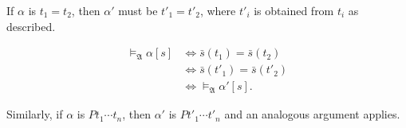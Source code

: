 If $\alpha$ is $t_1 = t_2$, then $\alpha'$ must be $t'_1 = t'_2$, where $t'_i$ is obtained from $t_i$ as described.

\begin{align*}
  \vDash_{\mathfrak{A}} \alpha[s]
   & \iff \bar{s}(t_1) = \bar{s}(t_2)       \\
   & \iff \bar{s}(t'_1) = \bar{s}(t'_2)     \\
   & \iff \vDash_{\mathfrak{A}} \alpha'[s].
\end{align*}

Similarly, if $\alpha$ is $P t_1 \cdots t_n$, then $\alpha'$ is $P t'_1 \cdots t'_n$ and an analogous argument applies.
